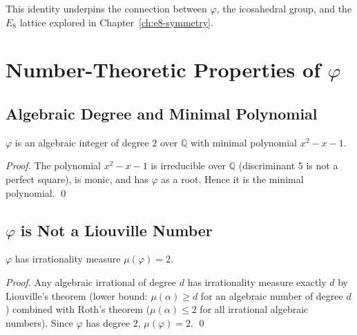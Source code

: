 This identity underpins the connection between $\varphi$, the icosahedral
group, and the $E_8$ lattice explored in Chapter~\ref{ch:e8-symmetry}.


\section{Number-Theoretic Properties of $\varphi$}
\label{sec:monad-number-theory}

\subsection{Algebraic Degree and Minimal Polynomial}

\begin{proposition}\label{prop:degree}
  $\varphi$ is an algebraic integer of degree $2$ over $\mathbb{Q}$
  with minimal polynomial $x^2 - x - 1$.
\end{proposition}

\begin{proof}
  The polynomial $x^2 - x - 1$ is irreducible over $\mathbb{Q}$
  (discriminant $5$ is not a perfect square), is monic, and has $\varphi$
  as a root.  Hence it is the minimal polynomial.  \qed
\end{proof}

\subsection{$\varphi$ is Not a Liouville Number}

\begin{proposition}\label{prop:not-liouville}
  $\varphi$ has irrationality measure $\mu(\varphi) = 2$.
\end{proposition}

\begin{proof}
  Any algebraic irrational of degree $d$ has irrationality measure
  exactly $d$ by Liouville's theorem (lower bound: $\mu(\alpha) \geq d$
  for an algebraic number of degree $d$) combined with Roth's theorem
  ($\mu(\alpha) \leq 2$ for all irrational algebraic numbers).
  Since $\varphi$ has degree $2$, $\mu(\varphi) = 2$.  \qed
\end{proof}

